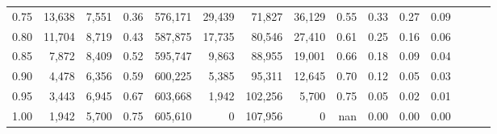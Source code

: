 \begin{tabular}{rrrrrrrrrrrrrrr}
0.75 &  13,638 &  7,551 &  0.36 &  576,171 &   29,439 &   71,827 &   36,129 &  0.55 &  0.33 &  0.27 &      0.09 \\
0.80 &  11,704 &  8,719 &  0.43 &  587,875 &   17,735 &   80,546 &   27,410 &  0.61 &  0.25 &  0.16 &      0.06 \\
0.85 &   7,872 &  8,409 &  0.52 &  595,747 &    9,863 &   88,955 &   19,001 &  0.66 &  0.18 &  0.09 &      0.04 \\
0.90 &   4,478 &  6,356 &  0.59 &  600,225 &    5,385 &   95,311 &   12,645 &  0.70 &  0.12 &  0.05 &      0.03 \\
0.95 &   3,443 &  6,945 &  0.67 &  603,668 &    1,942 &  102,256 &    5,700 &  0.75 &  0.05 &  0.02 &      0.01 \\
1.00 &   1,942 &  5,700 &  0.75 &  605,610 &        0 &  107,956 &        0 &   nan &  0.00 &  0.00 &      0.00 \\
\bottomrule
\end{tabular}
